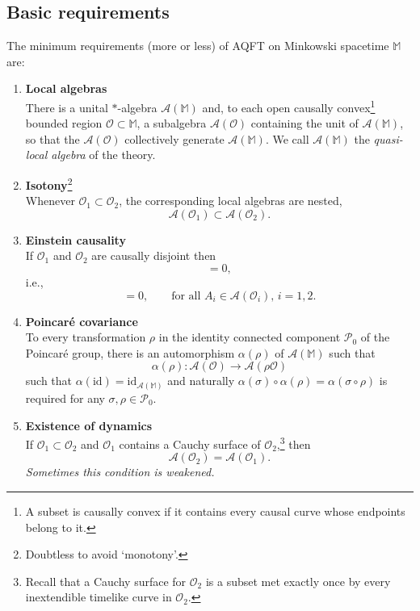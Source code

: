 \documentclass[12pt]{article}
\newcommand{\1}{\mathds{1}}                         %
\newcommand{\Ocal}{\mathcal{O}}
\newcommand{\MM}{\mathbb{M}}
\newcommand{\Ac}{{\mathcal{A}}}
\newcommand{\Pc}{{\mathcal{P}}}
\newcommand{\id}{{\textrm{id}}}
\begin{document}
	\subsection{Basic requirements}
	The minimum requirements (more or less) of AQFT on Minkowski spacetime $\MM$ are:
	\begin{enumerate}[label=\bf A\arabic{enumi},leftmargin=*,widest=4] 
		\item\label{it:loc} {\bf Local algebras}\\
		There is a unital $*$-algebra $\Ac(\MM)$ and, 
		to each open causally convex\footnote{A subset is causally convex if it contains every causal curve whose endpoints belong to it.} bounded region $\Ocal\subset\MM$, a subalgebra $\Ac(\Ocal)$ containing the unit of $\Ac(\MM)$, so that the $\Ac(\Ocal)$ collectively generate $\Ac(\MM)$. We call $\Ac(\MM)$ the \emph{quasi-local algebra} of the theory.
		\item\label{it:iso} {\bf Isotony}\footnote{Doubtless to avoid `monotony'.}\\
		Whenever $\Ocal_1\subset \Ocal_2$, the corresponding local algebras are nested, 
		\begin{equation}
		 \Ac(\Ocal_1)\subset \Ac(\Ocal_2).
		\end{equation} 
		\item\label{it:Eins} {\bf Einstein causality}\\ If $\Ocal_1$ and $\Ocal_2$ are causally disjoint then
		\begin{equation}
		[\Ac(\Ocal_1),\Ac(\Ocal_2)] = 0,
		\end{equation}
		i.e., 
		\begin{equation}
			[ A_1, A_2] = 0,\qquad\text{for all $A_i\in\Ac(\Ocal_i)$, $i=1,2$}.
		\end{equation} 
		\item\label{it:Poinc} {\bf Poincar\'e covariance}\\
		To every transformation $\rho$ in the identity connected component $\Pc_0$ of the Poincar\'e group, there is an automorphism $\alpha(\rho)$ of $\Ac(\MM)$ such that
		\begin{equation}
		\alpha(\rho):\Ac(\Ocal)\to \Ac(\rho \Ocal)
		\end{equation}
		such that $\alpha(\id)=\id_{\Ac(\MM)}$
		and naturally $\alpha(\sigma) \circ\alpha(\rho)  = \alpha(\sigma\circ\rho)$ is required for any  $\sigma,\rho\in\Pc_0$.  
		\item\label{it:dyn} {\bf Existence of dynamics}\\
		If $\Ocal_1\subset \Ocal_2$ and $\Ocal_1$ contains a Cauchy surface of $\Ocal_2$,\footnote{Recall that a Cauchy surface for $\Ocal_2$ is a subset met exactly once by every inextendible timelike curve in $\Ocal_2$.} then 
		\begin{equation}
		\Ac(\Ocal_2) = \Ac(\Ocal_1).
		\end{equation}
	 \emph{Sometimes this condition is weakened.}
	\end{enumerate}
\end{document}
